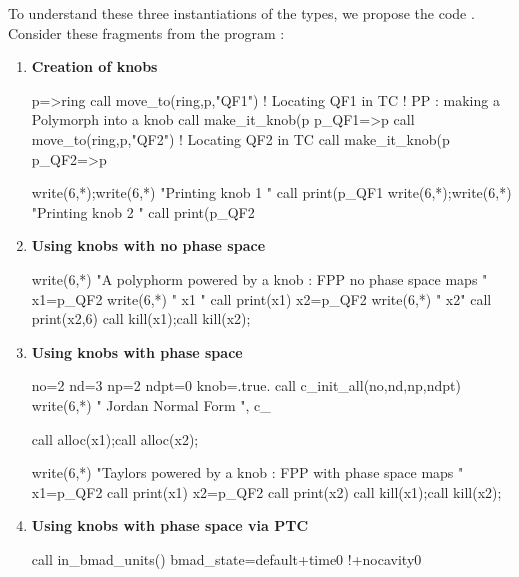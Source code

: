 \documentclass{hitec}     %
\begin{document}
{{To understand these three instantiations of the  types, we propose the  code . Consider these fragments from the program  :




 
 
 \begin{enumerate}
 \item\label{itc1} {\bf Creation of knobs}
 
  \begin{code}
p=>ring%
call move_to(ring,p,"QF1")   !  Locating QF1 in TC
!  PP : making a Polymorph into a knob
call make_it_knob(p%
p_QF1=>p
call move_to(ring,p,"QF2")   ! Locating QF2 in TC
call make_it_knob(p%
p_QF2=>p

write(6,*);write(6,*) "Printing knob 1  "
call print(p_QF1%
write(6,*);write(6,*) "Printing knob 2  "
call print(p_QF2%
  \end{code}
  
 \item\label{itc2} {\bf Using knobs with no phase space}
 
  \begin{code}
write(6,*) "A polyphorm powered by a knob : FPP no phase space maps "
x1=p_QF2%
write(6,*) " x1 "
call print(x1)
x2=p_QF2%
write(6,*) " x2"
call print(x2,6)
call kill(x1);call kill(x2);
  \end{code}
  
 \item\label{itc3} {\bf Using knobs with phase space}
 
  \begin{code}

no=2
nd=3
np=2
ndpt=0
knob=.true. 
call c_init_all(no,nd,np,ndpt)
write(6,*) " Jordan Normal Form ", c_%

call alloc(x1);call alloc(x2);

 

write(6,*) "Taylors powered by a knob : FPP with phase space maps "
x1=p_QF2%
call print(x1)
x2=p_QF2%
call print(x2)
call kill(x1);call kill(x2);
  \end{code}
  
 \item\label{itc4} {\bf Using knobs with phase space via PTC}
 
  \begin{code}
call in_bmad_units()
bmad_state=default+time0      !+nocavity0


\end{code}
\end{enumerate}}}
\end{document}
